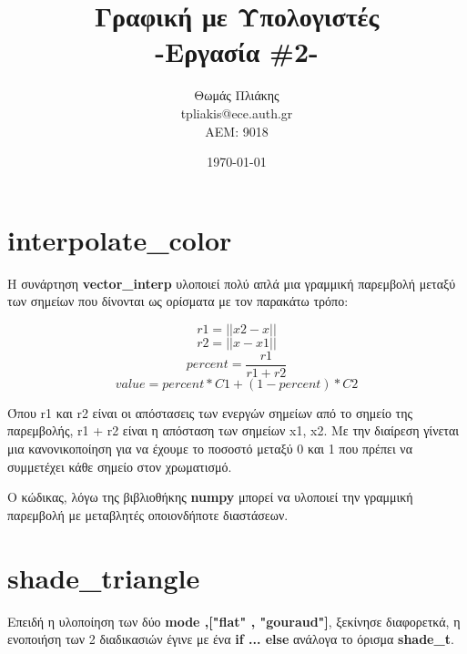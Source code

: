 \documentclass[10pt,a4paper]{article}
\title{ Γραφική με Υπολογιστές \\ -Εργασία \textlatin{\#}2-}
\author{Θωμάς Πλιάκης \\ \textlatin{tpliakis@ece.auth.gr} \\ AEM: 9018}
\date{\today}
\begin{document}
\maketitle

\section*{\textlatin{interpolate\_color}}
Η συνάρτηση \textbf{\textlatin{vector\_interp}} υλοποιεί πολύ απλά μια γραμμική παρεμβολή μεταξύ των σημείων που δίνονται ως ορίσματα με τον παρακάτω τρόπο:

\[r1 = ||x2-x||\]   
\[r2 = ||x-x1||\]
\[percent = \frac{r1}{r1 +r2}\]
\[value = percent*C1+(1-percent)*C2\]

Όπου \textlatin{r1} και \textlatin{r2} είναι οι απόστασεις των ενεργών σημείων από το σημείο της παρεμβολής, \textlatin{r1 + r2} είναι η απόσταση των σημείων \textlatin{x1}, \textlatin{x2}. Με την διαίρεση γίνεται μια κανονικοποίηση για να έχουμε το ποσοστό μεταξύ 0 και 1 που πρέπει να συμμετέχει κάθε σημείο στον χρωματισμό. 

Ο κώδικας, λόγω της βιβλιοθήκης \textbf{\textlatin{numpy}} μπορεί να υλοποιεί την γραμμική παρεμβολή με μεταβλητές οποιονδήποτε διαστάσεων.


\section*{\textlatin{shade\_triangle}}
Επειδή η υλοποίηση των δύο \textbf{\textlatin{mode ,["flat" , "gouraud"]}}, ξεκίνησε διαφορετκά, η ενοποιήση των 2 διαδικασιών έγινε με ένα \textbf{\textlatin{if ... else}} ανάλογα το όρισμα \textbf{\textlatin{shade\_t}}.
\end{document}
